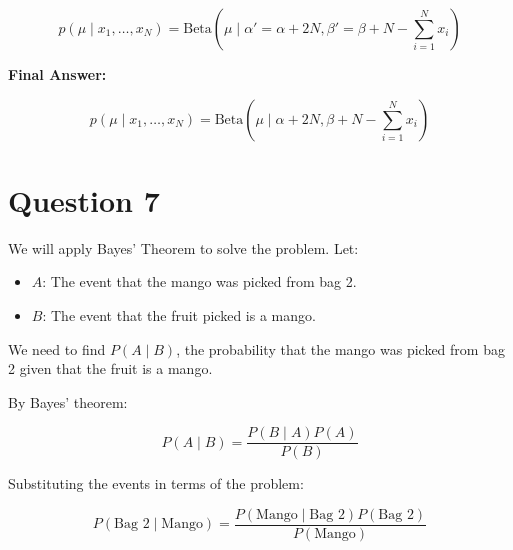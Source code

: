 \documentclass[12pt]{article}
\begin{document}
\[
p(\mu \mid x_1, \dots, x_N) = \text{Beta}(\mu \mid \alpha' = \alpha + 2N, \beta' = \beta + N - \sum_{i=1}^{N} x_i)
\]

\textbf{Final Answer:}

\[
p(\mu \mid x_1, \dots, x_N) = \text{Beta}(\mu \mid \alpha + 2N, \beta + N - \sum_{i=1}^{N} x_i)
\]

\section*{Question 7}

We will apply Bayes' Theorem to solve the problem. Let:
\begin{itemize}
    \item $A$: The event that the mango was picked from bag 2.
    \item $B$: The event that the fruit picked is a mango.
\end{itemize}

We need to find \( P(A \mid B) \), the probability that the mango was picked from bag 2 given that the fruit is a mango.

By Bayes' theorem:

\[
P(A \mid B) = \frac{P(B \mid A) P(A)}{P(B)}
\]

Substituting the events in terms of the problem:

\[
P(\text{Bag 2} \mid \text{Mango}) = \frac{P(\text{Mango} \mid \text{Bag 2}) P(\text{Bag 2})}{P(\text{Mango})}
\]
\end{document}
